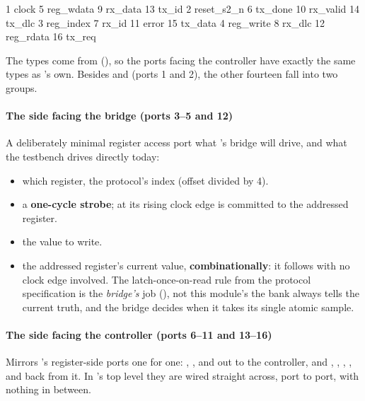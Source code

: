 \begin{textdrawing}
 1 clock        5 reg_wdata    9 rx_data     13 tx_id
 2 reset_s2_n   6 tx_done     10 rx_valid    14 tx_dlc
 3 reg_index    7 rx_id       11 error       15 tx_data
 4 reg_write    8 rx_dlc      12 reg_rdata   16 tx_req
\end{textdrawing}

The types come from  (), so the ports facing the controller
have exactly the same types as 's own. Besides  and
 (ports 1 and 2), the other fourteen fall into two groups.

\paragraph{The side facing the bridge (ports 3--5 and 12)}
A deliberately minimal register access port \textemdash{} what 's bridge will drive,
and what the testbench drives directly today:
\begin{itemize}
  \item {} \textemdash{} which register, the protocol's
    index (offset divided by 4).
  \item {} \textemdash{} a \textbf{one-cycle strobe}; at its rising clock
    edge  is committed to the addressed register.
  \item {} \textemdash{} the value to write.
  \item {} \textemdash{} the addressed register's
    current value, \textbf{combinationally}: it follows  with no clock edge involved.
    The latch-once-on-read rule from the protocol specification is the \emph{bridge's} job
    (), not this module's \textemdash{} the bank always tells the current truth, and
    the bridge decides when it takes its single atomic sample.
\end{itemize}

\paragraph{The side facing the controller (ports 6--11 and 13--16)}
Mirrors 's register-side ports one for one: , ,
 and  out to the controller, and , ,
, ,  and  back from it. In 's
top level they are wired straight across, port to port, with nothing in between.

